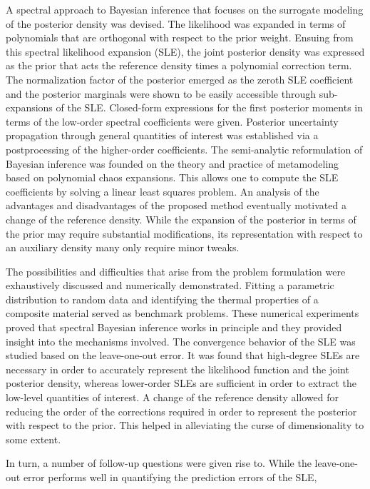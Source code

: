 A spectral approach to Bayesian inference that focuses on the surrogate modeling of the posterior density was devised.
The likelihood was expanded in terms of polynomials that are orthogonal with respect to the prior weight.
Ensuing from this spectral likelihood expansion (SLE), the joint posterior density was expressed
as the prior that acts the reference density times a polynomial correction term.
The normalization factor of the posterior emerged as the zeroth SLE coefficient and
the posterior marginals were shown to be easily accessible through sub-expansions of the SLE.
Closed-form expressions for the first posterior moments in terms of the low-order spectral coefficients were given.
Posterior uncertainty propagation through general quantities of interest was established via a postprocessing of the higher-order coefficients.
The semi-analytic reformulation of Bayesian inference was founded on the theory and practice of metamodeling based on polynomial chaos expansions.
This allows one to compute the SLE coefficients by solving a linear least squares problem.
An analysis of the advantages and disadvantages of the proposed method eventually motivated a change of the reference density.
While the expansion of the posterior in terms of the prior may require substantial modifications,
its representation with respect to an auxiliary density many only require minor tweaks.
\par %
The possibilities and difficulties that arise from the problem formulation were exhaustively discussed and numerically demonstrated.
Fitting a parametric distribution to random data and identifying the thermal properties of a composite material served as benchmark problems.
These numerical experiments proved that spectral Bayesian inference works in principle and they provided insight into the mechanisms involved.
The convergence behavior of the SLE was studied based on the leave-one-out error.
It was found that high-degree SLEs are necessary in order to accurately represent the likelihood function and the joint posterior density,
whereas lower-order SLEs are sufficient in order to extract the low-level quantities of interest.
A change of the reference density allowed for reducing the order of the corrections required in order to represent the posterior with respect to the prior.
This helped in alleviating the curse of dimensionality to some extent.
\par %
In turn, a number of follow-up questions were given rise to.
While the leave-one-out error performs well in quantifying the prediction errors of the SLE,
